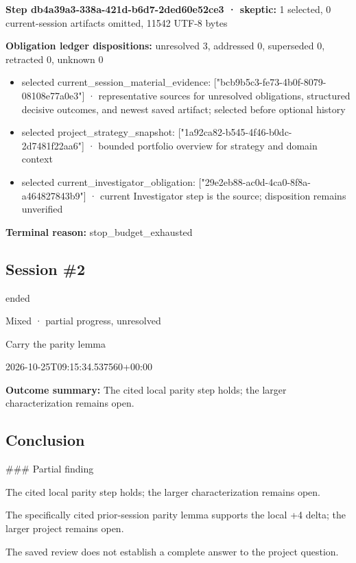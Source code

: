\documentclass[11pt]{article}
\begin{document}
\textbf{Step db4a39a3-338a-421d-b6d7-2ded60e52ce3 · skeptic:} 1 selected, 0 current-session artifacts omitted, 11542 UTF-8 bytes\par
\textbf{Obligation ledger dispositions:} unresolved 3, addressed 0, superseded 0, retracted 0, unknown 0\par
\begin{itemize}
\item selected current\_session\_material\_evidence: ["bcb9b5c3-fe73-4b0f-8079-08108e77a0e3"] · representative sources for unresolved obligations, structured decisive outcomes, and newest saved artifact; selected before optional history
\item selected project\_strategy\_snapshot: ["1a92ca82-b545-4f46-b0dc-2d7481f22aa6"] · bounded portfolio overview for strategy and domain context
\item selected current\_investigator\_obligation: ["29e2eb88-ac0d-4ca0-8f8a-a464827843b9"] · current Investigator step is the source; disposition remains unverified
\end{itemize}
\textbf{Terminal reason:} stop\_budget\_exhausted\par
\subsection{Session \#2}
\begin{description}[style=nextline,font=\normalfont\bfseries,leftmargin=0pt,labelsep=0pt]
\item[Execution status] ended
\item[Outcome] Mixed · partial progress, unresolved
\item[Strategy] Carry the parity lemma
\item[Started] 2026-10-25T09:15:34.537560+00:00
\end{description}
\textbf{Outcome summary:} The cited local parity step holds; the larger characterization remains open.\par
\subsection{Conclusion}
\#\#\# Partial finding

The cited local parity step holds; the larger characterization remains open.

The specifically cited prior-session parity lemma supports the local +4 delta; the larger project remains open.

The saved review does not establish a complete answer to the project question.
\end{document}
